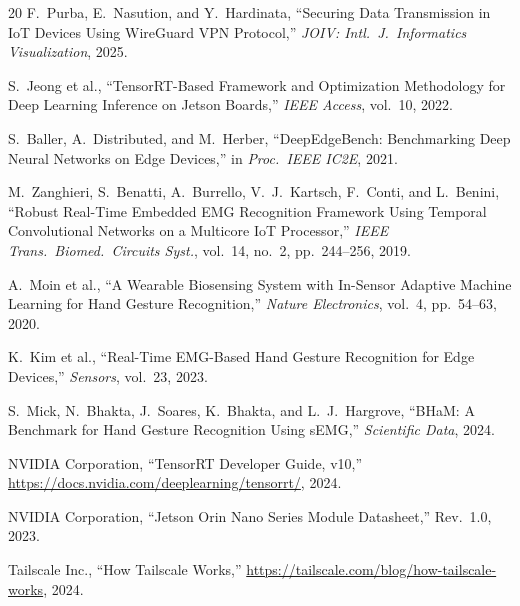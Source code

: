 \documentclass[10pt,twocolumn]{article}
\begin{document}
\begin{thebibliography}{20}
F.~Purba, E.~Nasution, and Y.~Hardinata,
``Securing Data Transmission in IoT Devices Using WireGuard VPN Protocol,''
\textit{JOIV: Intl.\ J.\ Informatics Visualization}, 2025.

S.~Jeong et al.,
``TensorRT-Based Framework and Optimization Methodology for Deep Learning
Inference on Jetson Boards,''
\textit{IEEE Access}, vol.~10, 2022.

S.~Baller, A.~Distributed, and M.~Herber,
``DeepEdgeBench: Benchmarking Deep Neural Networks on Edge Devices,''
in \textit{Proc.\ IEEE IC2E}, 2021.

M.~Zanghieri, S.~Benatti, A.~Burrello, V.~J.~Kartsch, F.~Conti,
and L.~Benini,
``Robust Real-Time Embedded EMG Recognition Framework Using Temporal
Convolutional Networks on a Multicore IoT Processor,''
\textit{IEEE Trans.\ Biomed.\ Circuits Syst.}, vol.~14, no.~2,
pp.~244--256, 2019.

A.~Moin et al.,
``A Wearable Biosensing System with In-Sensor Adaptive Machine Learning
for Hand Gesture Recognition,''
\textit{Nature Electronics}, vol.~4, pp.~54--63, 2020.

K.~Kim et al.,
``Real-Time EMG-Based Hand Gesture Recognition for Edge Devices,''
\textit{Sensors}, vol.~23, 2023.

S.~Mick, N.~Bhakta, J.~Soares, K.~Bhakta, and L.~J.~Hargrove,
``BHaM: A Benchmark for Hand Gesture Recognition Using sEMG,''
\textit{Scientific Data}, 2024.

NVIDIA Corporation,
``TensorRT Developer Guide, v10,''
\url{https://docs.nvidia.com/deeplearning/tensorrt/}, 2024.

NVIDIA Corporation,
``Jetson Orin Nano Series Module Datasheet,''
Rev.~1.0, 2023.

Tailscale Inc.,
``How Tailscale Works,''
\url{https://tailscale.com/blog/how-tailscale-works}, 2024.

\end{thebibliography}
\end{document}
